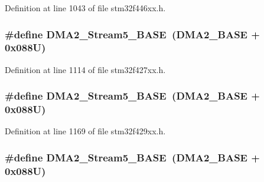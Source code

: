 Definition at line 1043 of file stm32f446xx.\+h.

\subsubsection[{\texorpdfstring{D\+M\+A2\+\_\+\+Stream5\+\_\+\+B\+A\+SE}{DMA2_Stream5_BASE}}]{\setlength{\rightskip}{0pt plus 5cm}\#define D\+M\+A2\+\_\+\+Stream5\+\_\+\+B\+A\+SE~({\bf D\+M\+A2\+\_\+\+B\+A\+SE} + 0x088\+U)}\hypertarget{group___peripheral__memory__map_gaed1460fdc407b6decfbffccb0260d0af}{}\label{group___peripheral__memory__map_gaed1460fdc407b6decfbffccb0260d0af}


Definition at line 1114 of file stm32f427xx.\+h.

\subsubsection[{\texorpdfstring{D\+M\+A2\+\_\+\+Stream5\+\_\+\+B\+A\+SE}{DMA2_Stream5_BASE}}]{\setlength{\rightskip}{0pt plus 5cm}\#define D\+M\+A2\+\_\+\+Stream5\+\_\+\+B\+A\+SE~({\bf D\+M\+A2\+\_\+\+B\+A\+SE} + 0x088\+U)}\hypertarget{group___peripheral__memory__map_gaed1460fdc407b6decfbffccb0260d0af}{}\label{group___peripheral__memory__map_gaed1460fdc407b6decfbffccb0260d0af}


Definition at line 1169 of file stm32f429xx.\+h.

\subsubsection[{\texorpdfstring{D\+M\+A2\+\_\+\+Stream5\+\_\+\+B\+A\+SE}{DMA2_Stream5_BASE}}]{\setlength{\rightskip}{0pt plus 5cm}\#define D\+M\+A2\+\_\+\+Stream5\+\_\+\+B\+A\+SE~({\bf D\+M\+A2\+\_\+\+B\+A\+SE} + 0x088\+U)}\hypertarget{group___peripheral__memory__map_gaed1460fdc407b6decfbffccb0260d0af}{}\label{group___peripheral__memory__map_gaed1460fdc407b6decfbffccb0260d0af}


